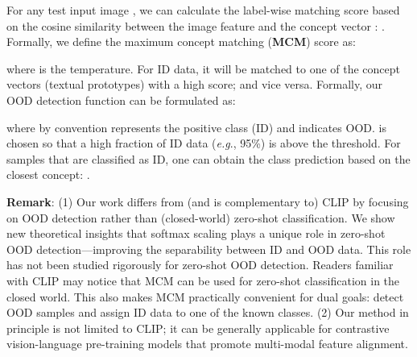 \documentclass{article}
\def\eg{\emph{e.g}., }
\begin{document}
For any test input image , we can calculate the label-wise matching score based on the cosine similarity between the image feature  and the concept vector : .
Formally,
we define the maximum concept matching (\textbf{MCM}) score as:

where  is the temperature. For ID data, it will be matched to one of the concept vectors (textual prototypes) with a high score; and vice versa.
Formally, our OOD detection function can be formulated as:
 
where by convention  represents the positive class (ID) and  indicates OOD.  is chosen so that a high fraction of ID data (\eg 95\%) is above the threshold. For samples that are classified as ID, one can obtain the class prediction based on the closest concept:
. 

\textbf{Remark}: (1) Our work differs from (and is complementary to) CLIP by focusing on OOD detection rather than (closed-world) zero-shot classification. We show new theoretical insights that softmax scaling plays a unique role in zero-shot OOD detection---improving the separability between ID and OOD data. This role has not been studied rigorously for zero-shot OOD detection. Readers familiar with CLIP may notice that MCM can be used for zero-shot classification in the closed world. This also makes MCM practically convenient for dual goals: detect OOD samples and assign ID data to one of the known classes. (2) Our method in principle is not limited to CLIP; it can be generally applicable for contrastive vision-language pre-training models that promote multi-modal feature alignment. 
\end{document}
